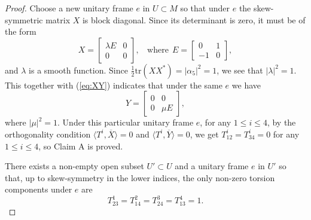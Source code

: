 \documentclass{amsart}
\begin{document}
\begin{proof}
Choose a new unitary frame $e$ in $U\subset M$ so that under $e$ the skew-symmetric matrix $X$ is block diagonal. Since its determinant is zero, it must be of the form
$$ X = \left[ \begin{array}{cc} \lambda E & 0 \\ 0 & 0 \end{array} \right], \ \ \  \ \mbox{where} \ \  E = \left[ \begin{array}{cc} 0 & 1 \\ -1 & 0 \end{array} \right] , $$
and $\lambda$ is a smooth function. Since $\frac{1}{2}\mbox{tr}(XX^{\ast})=|\alpha_5|^2 =1$, we see that $|\lambda|^2=1$.
This together with (\ref{eq:XY}) indicates that under the same $e$ we have
$$ Y = \left[ \begin{array}{cc} 0 & 0 \\ 0 & \mu E  \end{array} \right], $$
where $|\mu|^2 = 1$. Under this particular unitary frame $e$, for any $1\leq i\leq 4$, by the orthogonality condition $\langle T^i,\overline{X}\rangle = 0$ and  $\langle T^i,\overline{Y}\rangle = 0$, we get $T^i_{12}=T^i_{34}=0$ for any $1\leq i\leq 4$, so Claim A is proved.


\vspace{0.3cm}

 There exists a non-empty open subset $U'\subset U$ and a unitary frame $e$ in $U'$ so that, up to skew-symmetry in the lower indices, the only non-zero torsion components under $e$ are
\begin{equation} \label{eq:T}
T^1_{23}=T^2_{14}=T^3_{24}=T^4_{13}=1.
\end{equation}


\end{proof}
\end{document}
